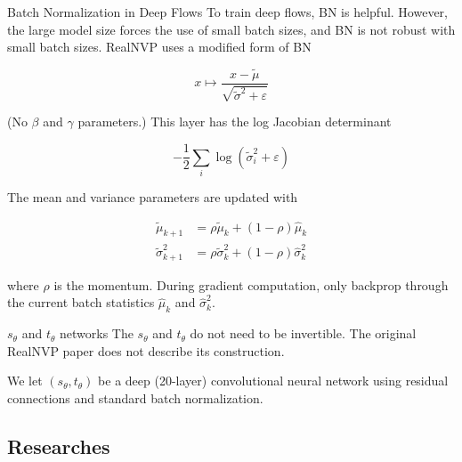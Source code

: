 \begin{frame}[allowframebreaks]

\begin{myconceptblock}{10.31}{Batch Normalization in Deep Flows}
    To train deep flows, BN is helpful. However, the large model size forces the use of small batch sizes, and BN is not robust with small batch sizes. RealNVP uses a modified form of BN

    $$
    x \mapsto \frac{x-\tilde{\mu}}{\sqrt{\tilde{\sigma}^{2}+\varepsilon}}
    $$

    (No $\beta$ and $\gamma$ parameters.) This layer has the log Jacobian determinant

    $$
    -\frac{1}{2} \sum_{i} \log \left(\tilde{\sigma}_{i}^{2}+\varepsilon\right)
    $$

    The mean and variance parameters are updated with

    $$
    \begin{aligned}
    \tilde{\mu}_{k+1} & =\rho \tilde{\mu}_{k}+(1-\rho) \hat{\mu}_{k} \\
    \tilde{\sigma}_{k+1}^{2} & =\rho \tilde{\sigma}_{k}^{2}+(1-\rho) \hat{\sigma}_{k}^{2}
    \end{aligned}
    $$

    where $\rho$ is the momentum. During gradient computation, only backprop through the current batch statistics $\hat{\mu}_{k}$ and $\hat{\sigma}_{k}^{2}$.
\end{myconceptblock}

\end{frame}

\begin{frame}[allowframebreaks]

\begin{myconceptblock}{10.32}{$s_{\theta}$ and $t_{\theta}$ networks}
    The $s_{\theta}$ and $t_{\theta}$ do not need to be invertible. The original RealNVP paper does not describe its construction.

    We let $\left(s_{\theta}, t_{\theta}\right)$ be a deep (20-layer) convolutional neural network using residual connections and standard batch normalization.
\end{myconceptblock}

\end{frame}

\subsection{Researches}

